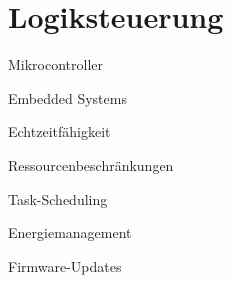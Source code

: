 \section{Logiksteuerung} 
Mikrocontroller

Embedded Systems

Echtzeitfähigkeit

Ressourcenbeschränkungen

Task-Scheduling

Energiemanagement

Firmware-Updates
